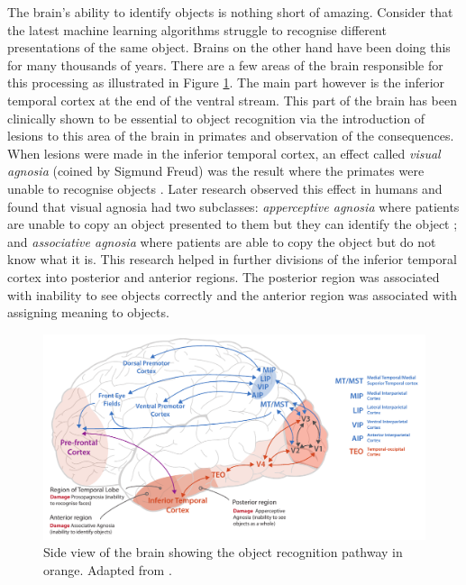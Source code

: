 The brain's ability to identify objects is nothing short of amazing. 
Consider that the latest machine learning algorithms struggle to recognise different presentations of the same object. 
Brains on the other hand have been doing this for many thousands of years. 
There are a few areas of the brain responsible for this processing as illustrated in Figure \ref{fig:pathway-object-recognition}. 
The main part however is the inferior temporal cortex at the end of the ventral stream. 
This part of the brain has been clinically shown to be essential to object recognition \cite{kandel2012principles} via the introduction of lesions to this area of the brain in primates and observation of the consequences. 
When lesions were made in the inferior temporal cortex, an effect called \emph{visual agnosia} (coined by Sigmund Freud) was the result where the primates were unable to recognise objects \cite{kandel2012principles}. 
Later research observed this effect in humans and found that visual agnosia had two subclasses: 
\emph{apperceptive agnosia} where patients are unable to copy an object presented to them but they can identify the object \cite{Ferreira01091998}; and 
\emph{associative agnosia} where patients are able to copy the object but do not know what it is\cite{farah1990visual}. 
This research helped in further divisions of the inferior temporal cortex into posterior and anterior regions. 
The posterior region was associated with inability to see objects correctly and the anterior region was associated with assigning meaning to objects.

\begin{figure}[t!]
\centering
\includegraphics[width=\textwidth]{images/related-work/pathway-object-recognition}
\caption{Side view of the brain showing the object recognition pathway in orange. Adapted from \cite{kandel2012principles}.}
\label{fig:pathway-object-recognition}
\end{figure}

